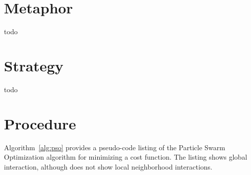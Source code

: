 \documentclass[a4paper, 11pt]{article}
\begin{document}
\section{Metaphor}
\label{sec:metaphor}
todo

\section{Strategy}
\label{sec:strategy}
todo

\section{Procedure}
\label{sec:procedure}
Algorithm~\ref{alg:pso} provides a pseudo-code listing of the Particle Swarm Optimization algorithm for minimizing a cost function. The listing shows global interaction, although does not show local neighborhood interactions.
\end{document}
